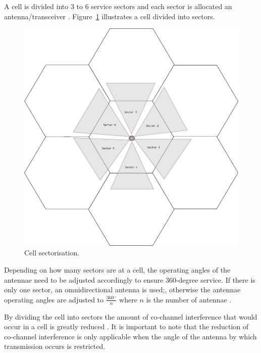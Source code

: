A cell is divided into 3 to 6 service sectors and each sector is allocated an antenna/transceiver \cite{GSMSysEngin}. Figure~\ref{fig:cellsector} illustrates a cell divided into sectors. 

\begin{figure}[H]
	\begin{centering}
	\includegraphics[scale=0.5]{tikz-pics/cellsector.pdf}
	\caption[Cell Sectorization]{Cell sectorisation\cite{GSMSysEngin}.}
	\label{fig:cellsector}
	\end{centering}
\end{figure}

Depending on how many sectors are at a cell, the operating angles of the antennae need to be adjusted accordingly to ensure 360-degree service. If there is only one sector, an omnidirectional antenna is used;, otherwise the antennae operating angles are adjusted to $\frac{360\,^{\circ}}{n}$ where ${n}$ is the number of antennae \cite{Eisenblatter}.

By dividing the cell into sectors the amount of co-channel interference that would occur in a cell is greatly reduced \cite{GSMArchitectureProtocolsServices}. It is important to note that the reduction of co-channel interference is only applicable when the angle of the antenna by which transmission occurs is restricted\cite{GSMArchitectureProtocolsServices}.

